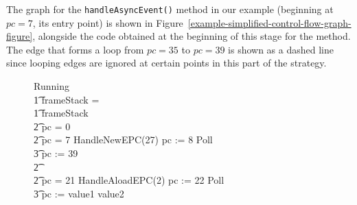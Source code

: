 The graph for the \texttt{handleAsyncEvent()} method in our example
(beginning at $pc=7$, its entry point) is shown in
Figure~\ref{example-simplified-control-flow-graph-figure}, alongside
the \Circus{} code obtained at the beginning of this stage for the
method.
The edge that forms a loop from $pc=35$ to $pc=39$ is shown as a
dashed line since looping edges are ignored at certain points in this
part of the strategy.
\begin{figure}
  \begin{center}
    \begin{minipage}{0.3\linewidth}
    \end{minipage}
    \begin{minipage}{0.6\linewidth}
      \scriptsize
      \setlength{\zedindent}{0cm}
      \begin{circus}
        Running \circdef \\
        \t1 \circif frameStack = \emptyset \circthen \Skip \\
        \t1 {} \circelse frameStack \neq \emptyset \circthen {} \\
        \t2 \circif pc = 0 \circthen {} \cdots {} \\
        \t2 {} \circelse pc = 7 \circthen HandleNewEPC(27) \circseq pc := 8 \circseq Poll \circseq \cdots \circseq \\
        \t3 pc := 39 \\
        \t2 {} \cdots {} \\
        \t2 {} \circelse pc = 21 \circthen HandleAloadEPC(2) \circseq pc := 22 \circseq Poll \circseq \cdots \circseq \\
        \t3 pc := \IF value1 \leq value2   \\

\end{circus}
\end{minipage}
\end{center}
\end{figure}

